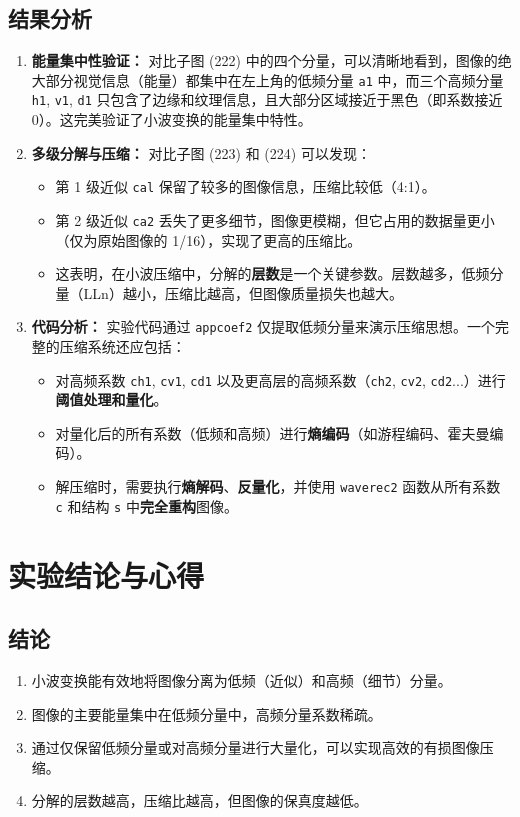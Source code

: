 \documentclass[a4paper]{ctexart}
\begin{document}
	\subsection{结果分析}
	\begin{enumerate}
		\item \textbf{能量集中性验证：} 对比子图 (222) 中的四个分量，可以清晰地看到，图像的绝大部分视觉信息（能量）都集中在左上角的低频分量 \texttt{a1} 中，而三个高频分量 \texttt{h1}, \texttt{v1}, \texttt{d1} 只包含了边缘和纹理信息，且大部分区域接近于黑色（即系数接近 0）。这完美验证了小波变换的能量集中特性。
		\item \textbf{多级分解与压缩：} 对比子图 (223) 和 (224) 可以发现：
		\begin{itemize}
			\item 第 1 级近似 \texttt{cal} 保留了较多的图像信息，压缩比较低（4:1）。
			\item 第 2 级近似 \texttt{ca2} 丢失了更多细节，图像更模糊，但它占用的数据量更小（仅为原始图像的 1/16），实现了更高的压缩比。
			\item 这表明，在小波压缩中，分解的\textbf{层数}是一个关键参数。层数越多，低频分量（LLn）越小，压缩比越高，但图像质量损失也越大。
		\end{itemize}
		\item \textbf{代码分析：} 实验代码通过 \texttt{appcoef2} 仅提取低频分量来演示压缩思想。一个完整的压缩系统还应包括：
		\begin{itemize}
			\item 对高频系数 \texttt{ch1}, \texttt{cv1}, \texttt{cd1} 以及更高层的高频系数（\texttt{ch2}, \texttt{cv2}, \texttt{cd2}...）进行\textbf{阈值处理和量化}。
			\item 对量化后的所有系数（低频和高频）进行\textbf{熵编码}（如游程编码、霍夫曼编码）。
			\item 解压缩时，需要执行\textbf{熵解码}、\textbf{反量化}，并使用 \texttt{waverec2} 函数从所有系数 \texttt{c} 和结构 \texttt{s} 中\textbf{完全重构}图像。
		\end{itemize}
	\end{enumerate}
	
	\section{实验结论与心得}
	\subsection*{结论} %
	\begin{enumerate}
		\item 小波变换能有效地将图像分离为低频（近似）和高频（细节）分量。
		\item 图像的主要能量集中在低频分量中，高频分量系数稀疏。
		\item 通过仅保留低频分量或对高频分量进行大量化，可以实现高效的有损图像压缩。
		\item 分解的层数越高，压缩比越高，但图像的保真度越低。
	\end{enumerate}
	
\end{document}
